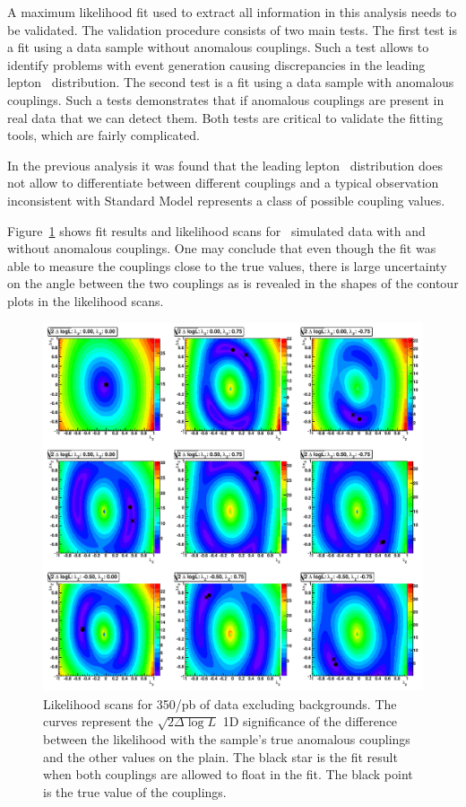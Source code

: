 A maximum likelihood fit used to extract all information in this
analysis needs to be validated. The validation procedure consists of
two main tests. The first test is a fit using a data sample without
anomalous couplings. Such a test allows to identify problems with
event generation causing discrepancies in the leading lepton
\pt\ distribution. The second test is a fit using a data sample with
anomalous couplings. Such a tests demonstrates that if anomalous
couplings are present in real data that we can detect them. Both tests
are critical to validate the fitting tools, which are fairly
complicated.

In the previous analysis it was found that the leading lepton
\pt\ distribution does not allow to differentiate between different
couplings and a typical observation inconsistent with Standard Model
represents a class of possible coupling values.

Figure~\ref{fig:val_scans} shows fit results and likelihood scans for
\ww\ simulated data with and without anomalous couplings. One may
conclude that even though the fit was able to measure the couplings
close to the true values, there is large uncertainty on the angle
between the two couplings as is revealed in the shapes of the contour
plots in the likelihood scans.

\begin{figure}[tp]
  \centerline{
    \includegraphics[width=1.0\textwidth]{figures/validation_likelihood_scans}
  }

  \caption[Likelihood scan for Signal Monte Carlo] {Likelihood scans
    for 350/pb of data excluding backgrounds. The curves
    represent the $\sqrt{2\Delta\log L}$ 1D significance of the difference between the
    likelihood with the sample's true anomalous couplings and the other
    values on the plain. The black star is the fit result when both couplings are
    allowed to float in the fit. The black point is the true value of the couplings.}
  \label{fig:val_scans}
\end{figure}

